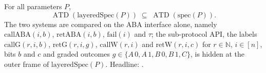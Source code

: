 \begin{theorem}
  \label{thm:aba-layeredspec-spec}
  \leanok
  For all parameters $P$,
  \[
    \operatorname{ATD}(\mathrm{layeredSpec}(P)) \;\subseteq\;
    \operatorname{ATD}(\mathrm{spec}(P)).
  \]
  The two systems are compared on the ABA interface alone, namely $\mathrm{callABA}(i,b)$, $\mathrm{retABA}(i,b)$, $\mathrm{fail}(i)$ and $\tau$; the sub-protocol API, the labels $\mathrm{callG}(r,i,b)$, $\mathrm{retG}(r,i,g)$, $\mathrm{callW}(r,i)$ and $\mathrm{retW}(r,i,c)$ for $r \in \mathbb{N}$, $i \in [n]$, bits $b$ and $c$ and graded outcomes $g \in \{A\,0, A\,1, B\,0, B\,1, C\}$, is hidden at the outer frame of $\mathrm{layeredSpec}(P)$.
  Headline: .
\end{theorem}


